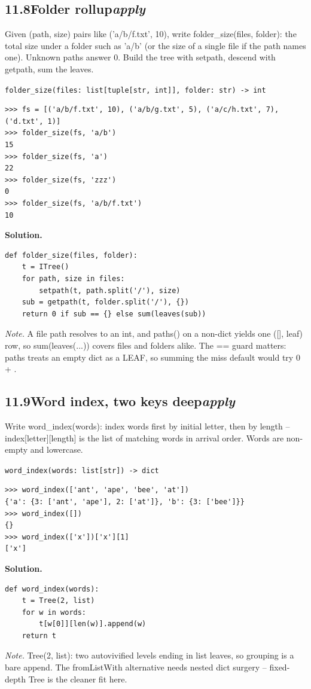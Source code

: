 \documentclass[10pt,letterpaper]{book}
\begin{document}
\subsection*{11.8\quad Folder rollup\hfill\textnormal{\textit{apply}}}
Given (path, size) pairs like ('a/b/f.txt', 10), write folder\_size(files, folder): the total size under a folder such as 'a/b' (or the size of a single file if the path names one). Unknown paths answer 0. Build the tree with setpath, descend with getpath, sum the leaves.

\noindent\texttt{folder\_size(files: list[tuple[str, int]], folder: str) -> int}
\begin{lstlisting}[style=ex]
>>> fs = [('a/b/f.txt', 10), ('a/b/g.txt', 5), ('a/c/h.txt', 7), ('d.txt', 1)]
>>> folder_size(fs, 'a/b')
15
>>> folder_size(fs, 'a')
22
>>> folder_size(fs, 'zzz')
0
>>> folder_size(fs, 'a/b/f.txt')
10
\end{lstlisting}
\noindent\textbf{Solution.}
\begin{lstlisting}[style=code]
def folder_size(files, folder):
    t = ITree()
    for path, size in files:
        setpath(t, path.split('/'), size)
    sub = getpath(t, folder.split('/'), {})
    return 0 if sub == {} else sum(leaves(sub))
\end{lstlisting}
\noindent\textit{Note.} A file path resolves to an int, and paths() on a non-dict yields one ([], leaf) row, so sum(leaves(...)) covers files and folders alike. The == {} guard matters: paths treats an empty dict as a LEAF, so summing the miss default would try 0 + {}.

\subsection*{11.9\quad Word index, two keys deep\hfill\textnormal{\textit{apply}}}
Write word\_index(words): index words first by initial letter, then by length -- index[letter][length] is the list of matching words in arrival order. Words are non-empty and lowercase.

\noindent\texttt{word\_index(words: list[str]) -> dict}
\begin{lstlisting}[style=ex]
>>> word_index(['ant', 'ape', 'bee', 'at'])
{'a': {3: ['ant', 'ape'], 2: ['at']}, 'b': {3: ['bee']}}
>>> word_index([])
{}
>>> word_index(['x'])['x'][1]
['x']
\end{lstlisting}
\noindent\textbf{Solution.}
\begin{lstlisting}[style=code]
def word_index(words):
    t = Tree(2, list)
    for w in words:
        t[w[0]][len(w)].append(w)
    return t
\end{lstlisting}
\noindent\textit{Note.} Tree(2, list): two autovivified levels ending in list leaves, so grouping is a bare append. The fromListWith alternative needs nested dict surgery -- fixed-depth Tree is the cleaner fit here.
\end{document}
